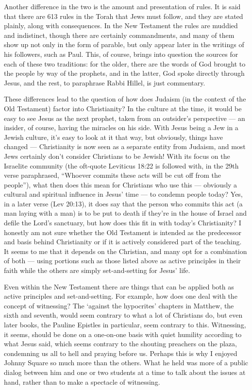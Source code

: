 Another difference in the two is the amount and presentation of rules. It is said that there are 613 rules in the Torah that Jews must follow, and they are stated plainly, along with consequences. In the New Testament the rules are muddied and indistinct, though there are certainly commandments, and many of them show up not only in the form of parable, but only appear later in the writings of his followers, such as Paul. This, of course, brings into question the sources for each of these two traditions: for the older, there are the words of God brought to the people by way of the prophets, and in the latter, God spoke directly through Jesus, and the rest, to paraphrase Rabbi Hillel, is just commentary.

These differences lead to the question of how does Judaism (in the context of the Old Testament) factor into Christianity? In the culture at the time, it would be easy to see Jesus as the next prophet, taken from an outsider's perspective --- an insider, of course, having the miracles on his side. With Jesus being a Jew in a Jewish culture, it's easy to look at it that way, but obviously, things have changed --- Christianity is now seen as a separate entity from Judaism, and most Jews certainly don't consider Christians to be Jewish! With its focus on the Israelite community (the oft-quote Leviticus 18:22 is followed with, in the 29th verse paraphrased, ``Whoever commits these acts will be cut off from the people''), what then does this mean for Christians who use this --- obviously a cultural and spiritual influence in Jesus' time --- to condemn people today? Yes, in a later verse (Lev 20:13), it does say that the person who commits this act (a man laying with a man) is to be put to death if they're in the house of Israel and defile the Lord's sanctuary, but how does this fit in with today's Christianity? I honestly am not sure whether the Old Testament is intended as the predecessor and basis behind Christianity or if it is actively considered part of the teaching. It seems to me that it depends on the Christian, and many opt for a combination of both --- using portions such as those listed above as active principles in their faith while the others are simply set-and-setting for Jesus' life.

Even within the New Testament there are things that can be applied both as active principles and set-and-setting. For example, how does one deal with the concept of witnessing? The `against the hypocrites' chapters in Matthew, the sixth and seventh, would seem contrary to what a lot of Christians do, but even later books, the Pauline Epistles in particular, seem contrary to this. Witnessing, it seems, should be done on a one-on-one basis with quiet humility according to what Jesus said, which seems contrary to the shouting preachers on the plaza, condemning us all to hell and praying before us. Perhaps this is why I enjoyed Johnny Square so much more than the others. What he held was more of a public dialog between him and one or two students at a time to talk about the issues at hand, rather than to make a spectacle of witnessing.

